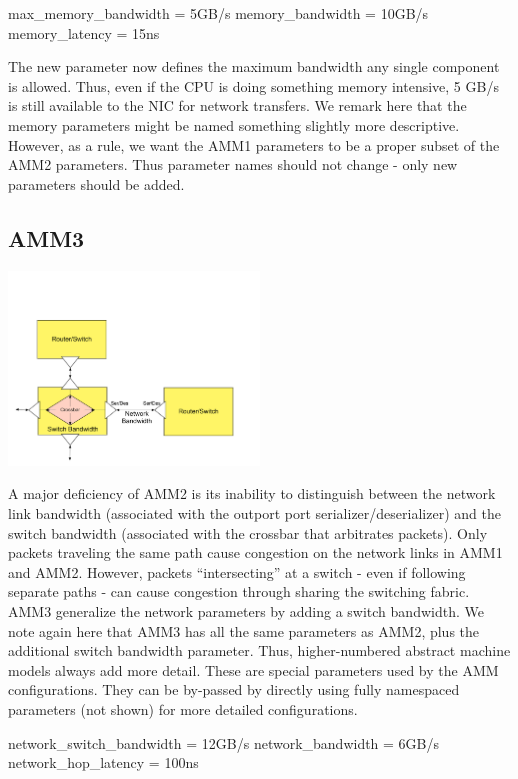 \begin{ViFile}
max_memory_bandwidth = 5GB/s
memory_bandwidth = 10GB/s
memory_latency = 15ns
\end{ViFile}
The new parameter  now defines the maximum bandwidth any single component is allowed.
Thus, even if the CPU is doing something memory intensive, 5 GB/s is still available to the NIC for network transfers.
We remark here that the memory parameters might be named something slightly more descriptive.
However, as a rule, we want the AMM1 parameters to be a proper subset of the AMM2 parameters.
Thus parameter names should not change - only new parameters should be added.

\subsection{AMM3}
\label{subsec:ammThree}

\begin{center}
\includegraphics[width=0.5\textwidth]{figures/amm/amm3_switch.pdf}
\end{center}

A major deficiency of AMM2 is its inability to distinguish between the network link bandwidth (associated with the outport port serializer/deserializer) and the switch bandwidth (associated with the crossbar that arbitrates packets).  
Only packets traveling the same path cause congestion on the network links in AMM1 and AMM2.
However, packets ``intersecting'' at a switch - even if following separate paths - can cause congestion through sharing the switching fabric.
AMM3 generalize the network parameters by adding a switch bandwidth.
We note again here that AMM3 has all the same parameters as AMM2, plus the additional switch bandwidth parameter.
Thus, higher-numbered abstract machine models always add more detail.
These are special parameters used by the AMM configurations.
They can be by-passed by directly using fully namespaced parameters (not shown) for more detailed configurations.

\begin{ViFile}
network_switch_bandwidth = 12GB/s
network_bandwidth = 6GB/s
network_hop_latency = 100ns
\end{ViFile}
